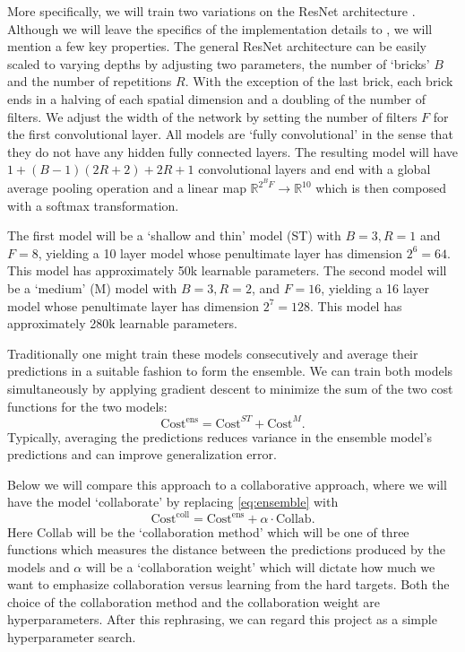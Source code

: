 \documentclass[english,a4paper,oneside]{amsart}
\theoremstyle{definition}
\begin{document}
More specifically, we will train two variations on the ResNet architecture \cite{ResNet}. Although we will leave the specifics of the implementation details to \cite{ResNet}, we will mention a few key properties. The general ResNet architecture can be easily scaled to varying depths by adjusting two parameters, the number of `bricks' $B$ and the number of repetitions $R$. With the exception of the last brick, each brick ends in a halving of each spatial dimension and a doubling of the number of filters. We adjust the width of the network by setting the number of filters $F$ for the first convolutional layer. All models are `fully convolutional' in the sense that they do not have any hidden fully connected layers. The resulting model will have $1+(B-1)(2R+2)+2R+1$ convolutional layers and end with a global average pooling operation and a linear map $\mathbb{R}^{2^B F} \to \mathbb{R}^{10}$ which is then composed with a softmax transformation. 

The first model will be a `shallow and thin' model (ST) with $B=3, R=1$ and $F=8$, yielding a 10 layer model whose penultimate layer has dimension $2^{6}=64$.  This model has approximately 50k learnable parameters. The second model will be a `medium' (M) model with $B=3, R=2$, and $F=16$, yielding a 16 layer model whose penultimate layer has dimension $2^{7}=128$. This model has approximately 280k learnable parameters.  

Traditionally one might train these models consecutively and average their predictions in a suitable fashion to form the ensemble. We can train both models simultaneously by applying gradient descent to minimize the sum of the two cost functions for the two models:
\begin{equation}\label{eq:ensemble}
 \mathrm{Cost^{ens}} = \mathrm{Cost}^{ST} + \mathrm{Cost}^{M}.
 \end{equation}
Typically, averaging the predictions reduces variance in the ensemble model's predictions and can improve generalization error. 

Below we will compare this approach to a collaborative approach, where we will have the model `collaborate' by replacing \eqref{eq:ensemble} with 
\begin{equation}\label{eq:collab}
 \mathrm{Cost^{coll}} = \mathrm{Cost^{ens}} + \alpha \cdot \mathrm{Collab}.
\end{equation} 
Here $\mathrm{Collab}$ will be the `collaboration method' which will be one of three functions which measures the distance between the predictions produced by the models and $\alpha$ will be a `collaboration weight' which will dictate how much we want to emphasize collaboration versus learning from the hard targets. Both the choice of the collaboration method and the collaboration weight are hyperparameters. After this rephrasing, we can regard this project as a simple hyperparameter search.
\end{document}
